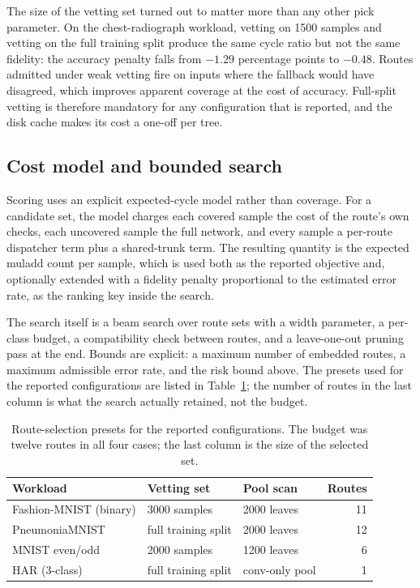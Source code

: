 The size of the vetting set turned out to matter more than any other pick parameter.
On the chest-radiograph workload, vetting on 1500 samples and vetting on the full training split produce the same cycle ratio but not the same fidelity: the accuracy penalty falls from \(-1.29\) percentage points to \(-0.48\).
Routes admitted under weak vetting fire on inputs where the fallback would have disagreed, which improves apparent coverage at the cost of accuracy.
Full-split vetting is therefore mandatory for any configuration that is reported, and the disk cache makes its cost a one-off per tree.

\subsection{Cost model and bounded search}

Scoring uses an explicit expected-cycle model rather than coverage.
For a candidate set, the model charges each covered sample the cost of the route's own checks, each uncovered sample the full network, and every sample a per-route dispatcher term plus a shared-trunk term.
The resulting quantity is the expected muladd count per sample, which is used both as the reported objective and, optionally extended with a fidelity penalty proportional to the estimated error rate, as the ranking key inside the search.

The search itself is a beam search over route sets with a width parameter, a per-class budget, a compatibility check between routes, and a leave-one-out pruning pass at the end.
Bounds are explicit: a maximum number of embedded routes, a maximum admissible error rate, and the risk bound above.
The presets used for the reported configurations are listed in Table~\ref{tab:impl-pick}; the number of routes in the last column is what the search actually retained, not the budget.

\begin{table}[H]
	\centering
	\small
	\caption{Route-selection presets for the reported configurations.
		The budget was twelve routes in all four cases; the last column is the size of the selected set.}
	\label{tab:impl-pick}
	\begin{tabularx}{\textwidth}{@{}>{\raggedright\arraybackslash}p{}XXr@{}}
		\toprule
		\textbf{Workload} & \textbf{Vetting set} & \textbf{Pool scan} & \textbf{Routes} \\
		\midrule
		Fashion-MNIST (binary) & 3000 samples & 2000 leaves & 11 \\
		PneumoniaMNIST & full training split & 2000 leaves & 12 \\
		MNIST even/odd & 2000 samples & 1200 leaves & 6 \\
		HAR (3-class) & full training split & conv-only pool & 1 \\
		\bottomrule
	\end{tabularx}
\end{table}

